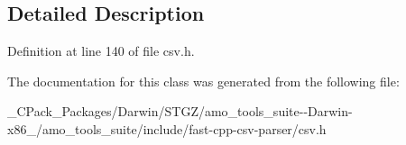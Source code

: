 \subsection{Detailed Description}


Definition at line 140 of file csv.\+h.



The documentation for this class was generated from the following file\+:\begin{DoxyCompactItemize}
\item 
\+\_\+\+C\+Pack\+\_\+\+Packages/\+Darwin/\+S\+T\+G\+Z/amo\+\_\+tools\+\_\+suite-\/-\/\+Darwin-\/x86\+\_/amo\+\_\+tools\+\_\+suite/include/fast-\/cpp-\/csv-\/parser/csv.\+h\end{DoxyCompactItemize}
